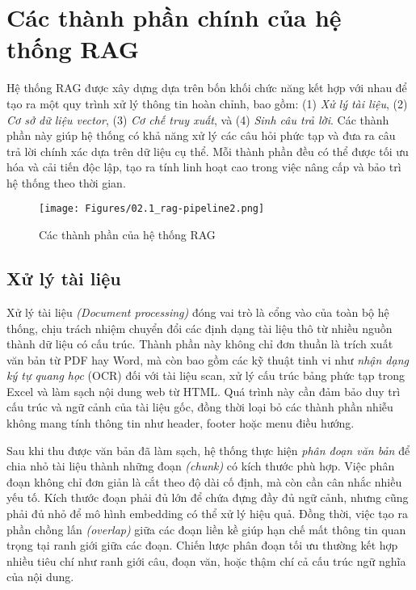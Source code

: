 \section{Các thành phần chính của hệ thống RAG}

Hệ thống RAG được xây dựng dựa trên bốn khối chức năng kết hợp với nhau để tạo ra một quy trình xử lý thông tin hoàn chỉnh, bao gồm: (1) \emph{Xử lý tài liệu}, (2) \emph{Cơ sở dữ liệu vector}, (3) \emph{Cơ chế truy xuất}, và (4) \emph{Sinh câu trả lời}. Các thành phần này giúp hệ thống có khả năng xử lý các câu hỏi phức tạp và đưa ra câu trả lời chính xác dựa trên dữ liệu cụ thể. Mỗi thành phần đều có thể được tối ưu hóa và cải tiến độc lập, tạo ra tính linh hoạt cao trong việc nâng cấp và bảo trì hệ thống theo thời gian.

\begin{figure}[H]
    \centering
    \texttt{[image: Figures/02.1\_rag-pipeline2.png]}
    \caption{Các thành phần của hệ thống RAG}
    \label{fig:rag-full}
\end{figure}

\subsection{Xử lý tài liệu}

{Xử lý tài liệu} \emph{(Document processing)} đóng vai trò là cổng vào của toàn bộ hệ thống, chịu trách nhiệm chuyển đổi các định dạng tài liệu thô từ nhiều nguồn thành dữ liệu có cấu trúc. Thành phần này không chỉ đơn thuần là trích xuất văn bản từ PDF hay Word, mà còn bao gồm các kỹ thuật tinh vi như \emph{nhận dạng ký tự quang học} (OCR) đối với tài liệu scan, xử lý cấu trúc bảng phức tạp trong Excel và làm sạch nội dung web từ HTML. Quá trình này cần đảm bảo duy trì cấu trúc và ngữ cảnh của tài liệu gốc, đồng thời loại bỏ các thành phần nhiễu không mang tính thông tin như header, footer hoặc menu điều hướng.

Sau khi thu được văn bản đã làm sạch, hệ thống thực hiện \emph{phân đoạn văn bản} để chia nhỏ tài liệu thành những đoạn \emph{(chunk)} có kích thước phù hợp. Việc phân đoạn không chỉ đơn giản là cắt theo độ dài cố định, mà còn cần cân nhắc nhiều yếu tố. Kích thước đoạn phải đủ lớn để chứa đựng đầy đủ ngữ cảnh, nhưng cũng phải đủ nhỏ để mô hình embedding có thể xử lý hiệu quả. Đồng thời, việc tạo ra phần chồng lấn \emph{(overlap)} giữa các đoạn liền kề giúp hạn chế mất thông tin quan trọng tại ranh giới giữa các đoạn. Chiến lược phân đoạn tối ưu thường kết hợp nhiều tiêu chí như ranh giới câu, đoạn văn, hoặc thậm chí cả cấu trúc ngữ nghĩa của nội dung.

